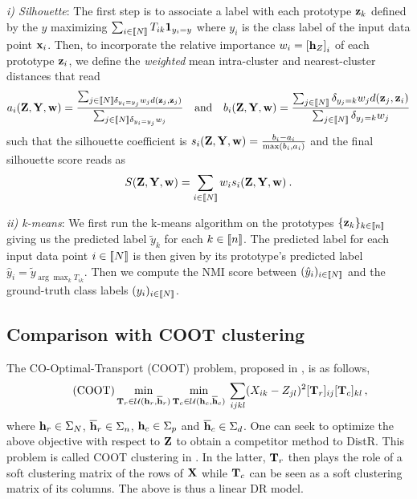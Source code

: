 \textit{i) Silhouette}: The first step is to associate a label with each prototype ${\mathbf{z}}_k$ defined by the $y$ maximizing $\sum_{i \in {[\![N]\!]}} T_{ik} \bm{1}_{y_i = y}$ where $y_i$ is the class label of the input data point ${\mathbf{x}}_i$. Then, to incorporate the relative importance $w_i = \left[{\mathbf{h}}_Z\right]_i$ of each prototype ${\mathbf{z}}_i$, we define the \emph{weighted} mean intra-cluster and nearest-cluster distances that read 
	\begin{equation}
		a_i (\mZ, \mY, \vw)= \frac{\sum_{j\in \integ{N} \delta_{y_i =y_j} w_j d(\vz_j, \vz_j)}}{\sum_{j \in \integ{N} \delta_{y_i = y_j} w_j }} \quad \text{and} \quad b_i (\mZ, \mY, \vw)= \frac{\sum_{j \in \integ{N}} \delta_{y_j = k} w_j d(\vz_j, \vz_i)}{ \sum_{j \in \integ{N}} \delta_{y_j = k}w_j }
	\end{equation}
	such that the silhouette coefficient is $s_i({\mathbf{Z}}, {\mathbf{Y}}, {\mathbf{w}}) = \frac{b_i - a_i}{\max(b_i, a_i)}$ and the final silhouette score reads as
	\begin{equation}
		S({\mathbf{Z}}, {\mathbf{Y}}, {\mathbf{w}}) = \sum_{i \in {[\![N]\!]}} w_i s_i({\mathbf{Z}}, {\mathbf{Y}}, {\mathbf{w}}) \:.
	\end{equation}

\textit{ii) k-means}: We first run the k-means algorithm on the prototypes $\{{\mathbf{z}}_k\}_{k \in {[\![n]\!]}}$ giving us the predicted label $\tilde{y}_k$ for each $k \in {[\![n]\!]}$. The predicted label for each input data point $i \in {[\![N]\!]}$ is then given by its prototype's predicted label \ie $\hat{y}_i = \tilde{y}_{\arg \max_k T_{ik}}$. Then we compute the NMI score \citep{kvaalseth2017normalized} between $(\hat{y}_i)_{i \in {[\![N]\!]}}$ and the ground-truth class labels $(y_i)_{i \in {[\![N]\!]}}$.

\subsection{Comparison with COOT clustering}\label{sec:coot_exp}

The CO-Optimal-Transport (COOT) problem, proposed in \citep{redko2020co}, is as follows,
\begin{align}\tag{COOT}
	\label{eq:coot_pb}
	\min_{{\mathbf{T}}_r \in {\mathcal{U}}({\mathbf{h}}_r, \overline{{\mathbf{h}}}_r)} \min_{ {\mathbf{T}}_c \in {\mathcal{U}}({\mathbf{h}}_c, \overline{{\mathbf{h}}}_c)} \: \sum_{ijkl} (X_{ik} - Z_{jl})^2 [{\mathbf{T}}_r]_{ij} [{\mathbf{T}}_c]_{kl} \,,
\end{align}
where ${\mathbf{h}}_r \in \Sigma_N$, $\overline{{\mathbf{h}}}_r \in \Sigma_n$, ${\mathbf{h}}_c \in \Sigma_p$ and $\overline{{\mathbf{h}}}_c \in \Sigma_d$. 
One can seek to optimize the above objective with respect to ${\mathbf{Z}}$ to obtain a competitor method to DistR. This problem is called COOT clustering in \citep{redko2020co}. In the latter, ${\mathbf{T}}_r$ then plays the role of a soft clustering matrix of the rows of ${\mathbf{X}}$ while ${\mathbf{T}}_c$ can be seen as a soft clustering matrix of its columns. The above is thus a linear DR model.


